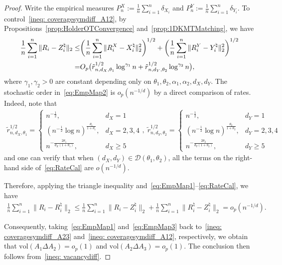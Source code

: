 \documentclass[11pt]{article}
\begin{document}
\begin{proof}
Write the empirical measures $P_n^X:= \frac{1}{n}\sum_{i = 1}^n \delta_{X_i}$ and $P_n^Y:= \frac{1}{n}\sum_{i = 1}^n \delta_{Y_i}$. To control~\eqref{ineq: coveragesymdiff_A12}, by Propositions~\ref{prop:HolderOTConvergence} and~\ref{prop:1DKMTMatching}, we have 
\begin{align}
    \frac{1}{n}\sum_{i = 1}^n \|R_i - Z_i^\natural \|_2 \leq & \biggl(\frac{1}{n}\sum_{i = 1}^n \|R_i^X -  X_i^\natural\|_2^2 \biggr)^{1/2}+  \biggl(\frac{1}{n}\sum_{i = 1}^n \|R_i^Y -  Y_i^\natural \|_2^2 \biggr)^{1/2} \notag \\ 
    = & O_p\bigl(\tilde r_{n, d_X, \theta_1}^{1/2}\log^{\gamma_1} n + \tilde r_{n, d_Y, \theta_2}^{1/2}\log^{\gamma_2} n\bigr) \label{eq:EmpMap2},
\end{align}
where $\gamma_1, \gamma_2>0$ are constant depending only on $\theta_1, \theta_2, \alpha_1, \alpha_2, d_X, d_Y$. The stochastic order in~\eqref{eq:EmpMap2} is $o_p(n^{-1/d})$ by a direct comparison of rates. 
Indeed, note that  
\begin{align}
    \tilde r_{n, d_X, \theta_1}^{1/2} = \begin{cases}
        n^{-\frac{1}{2}}, & d_X = 1 \\ 
        (n^{-\frac{1}{2}} \log n)^{\frac{\theta_1}{1+\theta_1}}, &d_X =2, 3, 4 \\ 
        n^{-\frac{2\theta_1}{d_X(1+\theta_1)}}, & d_X \geq 5 
    \end{cases}, \;
    \tilde r_{n, d_Y, \theta_2}^{1/2} = \begin{cases}
    n^{-\frac{1}{2}}, & d_Y = 1 \\ 
    (n^{-\frac{1}{2}} \log n)^{\frac{\theta_2}{1+\theta_2}}, & d_Y =2, 3, 4 \\ 
    n^{-\frac{2\theta_2}{d_Y(1+\theta_2)}}, & d_Y \geq 5 
\end{cases} \label{eq:RateCal}
\end{align}
and one can verify that when $(d_X, d_Y) \in \mathcal{D}(\theta_1, \theta_2)$, all the terms on the right-hand side of~\eqref{eq:RateCal} are $o(n^{-1/d})$.

Therefore, applying the triangle inequality and~\eqref{eq:EmpMap1}--\eqref{eq:RateCal}, we have
\begin{align}
    \frac{1}{n}\sum_{i = 1}^n  \|R_i - {R}_i^\natural\|_2  \leq \frac{1}{n}\sum_{i = 1}^n \|R_i - Z_i^\natural \|_2 + \frac{1}{n}\sum_{i = 1}^n \|R_i^\natural - Z_i^\natural \|_2 = o_p(n^{-1/d}). \label{eq:EmpMap3}
\end{align}

Consequently, taking~\eqref{eq:EmpMap1} and~\eqref{eq:EmpMap3} back to~\eqref{ineq: coveragesymdiff_A23} and~\eqref{ineq: coveragesymdiff_A12}, respectively, we obtain that $\mathrm{vol}(A_1\Delta {A}_2) = o_p(1)$ and $\mathrm{vol}(A_2 \Delta {A}_3) = o_p(1)$. The conclusion then follows from~\eqref{ineq: vacancydiff}.
\end{proof}
\end{document}
